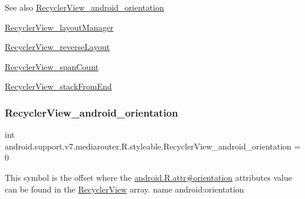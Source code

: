 \begin{DoxySeeAlso}{See also}
\hyperlink{classandroid_1_1support_1_1v7_1_1mediarouter_1_1R_1_1styleable_a621eb3784913669ba2918e93cd4458f3}{Recycler\+View\+\_\+android\+\_\+orientation} 

\hyperlink{classandroid_1_1support_1_1v7_1_1mediarouter_1_1R_1_1styleable_aade41b174f9f40b820e6afdd3f51413c}{Recycler\+View\+\_\+layout\+Manager} 

\hyperlink{classandroid_1_1support_1_1v7_1_1mediarouter_1_1R_1_1styleable_a80fce516766d6c33a441eea5da180b7b}{Recycler\+View\+\_\+reverse\+Layout} 

\hyperlink{classandroid_1_1support_1_1v7_1_1mediarouter_1_1R_1_1styleable_ac4cd1f480c58b2a594180fd85c5007ae}{Recycler\+View\+\_\+span\+Count} 

\hyperlink{classandroid_1_1support_1_1v7_1_1mediarouter_1_1R_1_1styleable_a6cee8e7efa348fbf26340673590b5287}{Recycler\+View\+\_\+stack\+From\+End} 
\end{DoxySeeAlso}
\mbox{\label{classandroid_1_1support_1_1v7_1_1mediarouter_1_1R_1_1styleable_a621eb3784913669ba2918e93cd4458f3}} 
\subsubsection{\texorpdfstring{Recycler\+View\+\_\+android\+\_\+orientation}{RecyclerView\_android\_orientation}}
{\footnotesize\ttfamily int android.\+support.\+v7.\+mediarouter.\+R.\+styleable.\+Recycler\+View\+\_\+android\+\_\+orientation = 0\hspace{0.3cm}{\ttfamily [static]}}

This symbol is the offset where the \hyperlink{}{android.\+R.\+attr\#orientation} attribute\textquotesingle{}s value can be found in the \hyperlink{classandroid_1_1support_1_1v7_1_1mediarouter_1_1R_1_1styleable_af634dfe19333cdc00d399d1f00635e93}{Recycler\+View} array.  name android\+:orientation \mbox{\label{classandroid_1_1support_1_1v7_1_1mediarouter_1_1R_1_1styleable_aade41b174f9f40b820e6afdd3f51413c}} 
